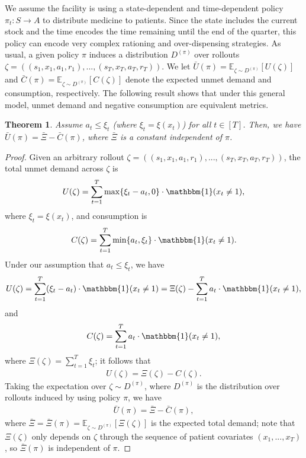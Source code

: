 \documentclass[12pt]{article}
\newtheorem{theorem}{Theorem}
\begin{document}
We assume the facility is using a state-dependent and time-dependent policy $\pi_t:S\to A$ to distribute medicine to patients. Since the state includes the current stock and the time encodes the time remaining until the end of the quarter, this policy can encode very complex rationing and over-dispensing strategies. As usual, a given policy $\pi$ induces a distribution $D^{(\pi)}$ over rollouts $\zeta=((s_1,x_1,a_1,r_1),...,(s_T,x_T,a_T,r_T))$. We let $\bar{U}(\pi)=\mathbb{E}_{\zeta\sim D^{(\pi)}}[U(\zeta)]$ and $\bar{C}(\pi)=\mathbb{E}_{\zeta\sim D^{(\pi)}}[C(\zeta)]$ denote the expected unmet demand and consumption, respectively. The following result shows that under this general model, unmet demand and negative consumption are equivalent metrics.

\begin{theorem}
Assume $a_t\le\xi_t$ (where $\xi_t=\xi(x_t)$) for all $t\in[T]$. Then, we have $\bar{U}(\pi)=\bar{\Xi}-\bar{C}(\pi)$, where $\bar{\Xi}$ is a constant independent of $\pi$.
\end{theorem}

\begin{proof}
Given an arbitrary rollout $\zeta=((s_1,x_1,a_1,r_1),...,(s_T,x_T,a_T,r_T))$, the total unmet demand across $\zeta$ is
\begin{align*}
U(\zeta)=\sum_{t=1}^T\max\{\xi_t-a_t,0\}\cdot\mathbbm{1}(x_t\neq1),
\end{align*}
where $\xi_t=\xi(x_t)$, and consumption is
\begin{align*}
C(\zeta)=\sum_{t=1}^T\min\{a_t,\xi_t\}\cdot\mathbbm{1}(x_t\neq1).
\end{align*}
Under our assumption that $a_t\le\xi_t$, we have
\begin{align*}
U(\zeta)
=\sum_{t=1}^T(\xi_t-a_t)\cdot\mathbbm{1}(x_t\neq1)=\Xi(\zeta)-\sum_{t=1}^Ta_t\cdot\mathbbm{1}(x_t\neq1),
\end{align*}
and
\begin{align*}
C(\zeta)
=\sum_{t=1}^Ta_t\cdot\mathbbm{1}(x_t\neq1),
\end{align*}
where $\Xi(\zeta)=\sum_{t=1}^T\xi_t$; it follows that
\begin{align*}
U(\zeta)=\Xi(\zeta)-C(\zeta).
\end{align*}
Taking the expectation over $\zeta\sim D^{(\pi)}$, where $D^{(\pi)}$ is the distribution over rollouts induced by using policy $\pi$, we have
\begin{align*}
\bar{U}(\pi)=\bar{\Xi}-\bar{C}(\pi),
\end{align*}
where $\bar{\Xi}=\bar{\Xi}(\pi)=\mathbb{E}_{\zeta\sim D^{(\pi)}}[\Xi(\zeta)]$ is the expected total demand; note that $\Xi(\zeta)$ only depends on $\zeta$ through the sequence of patient covariates $(x_1,...,x_T)$, so $\bar{\Xi}(\pi)$ is independent of $\pi$.
\end{proof}
\end{document}
